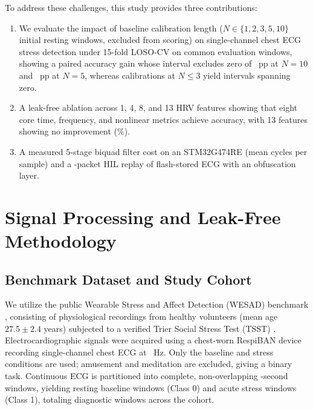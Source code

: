 \documentclass[conference]{IEEEtran}
\begin{document}
To address these challenges, this study provides three contributions:
\begin{enumerate}
    \item We evaluate the impact of baseline calibration length ($N \in \{1, 2, 3, 5, 10\}$ initial resting windows, excluded from scoring) on single-channel chest ECG stress detection under 15-fold LOSO-CV on \valEvalWindows common evaluation windows, showing a paired accuracy gain whose interval excludes zero of \valPairedGainNten~pp at $N=10$ and \valPairedGainNfive~pp at $N=5$, whereas calibrations at $N \le 3$ yield intervals spanning zero.
    \item A leak-free ablation across 1, 4, 8, and 13 HRV features showing that eight core time, frequency, and nonlinear metrics achieve \valNtenAccPct accuracy, with 13 features showing no improvement (\valAblThirteenNtenAcc\%).
    \item A measured 5-stage biquad filter cost on an STM32G474RE (\valBiquadMeanCycles mean cycles per sample) and a \valHilPackets-packet HIL replay of flash-stored ECG with an obfuscation layer.
\end{enumerate}

\section{Signal Processing and Leak-Free Methodology}

\subsection{Benchmark Dataset and Study Cohort}
We utilize the public Wearable Stress and Affect Detection (WESAD) benchmark \cite{schmidt2018wesad}, consisting of physiological recordings from \valNumSubjects healthy volunteers (mean age $27.5 \pm 2.4$ years) subjected to a verified Trier Social Stress Test (TSST) \cite{kirschbaum1993trier}. Electrocardiographic signals were acquired using a chest-worn RespiBAN device recording single-channel chest ECG at \valSamplingRateHz~Hz. Only the baseline and stress conditions are used; amusement and meditation are excluded, giving a binary task. Continuous ECG is partitioned into complete, non-overlapping \valWindowDurationSec-second windows, yielding \valBaselineWindows resting baseline windows (Class 0) and \valStressWindows acute stress windows (Class 1), totaling \valTotalWindows diagnostic windows across the cohort.
\end{document}
